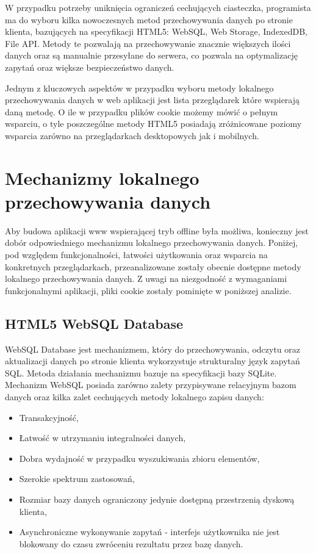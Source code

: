 W przypadku potrzeby uniknięcia ograniczeń cechujących ciasteczka, programista ma do wyboru kilka nowoczesnych metod przechowywania danych po stronie klienta, bazujących na specyfikacji HTML5: WebSQL, Web Storage, IndexedDB, File API. Metody te pozwalają na przechowywanie znacznie większych ilości danych oraz są manualnie przesyłane do serwera, co pozwala na optymalizację zapytań oraz większe bezpieczeństwo danych.

Jednym z kluczowych aspektów w przypadku wyboru metody lokalnego przechowywania danych w web aplikacji jest lista przeglądarek które wspierają daną metodę. O ile w przypadku plików cookie możemy mówić o pełnym wsparciu, o tyle poszczególne metody HTML5 posiadają zróżnicowane poziomy wsparcia zarówno na przeglądarkach desktopowych jak i mobilnych.

\section{Mechanizmy lokalnego przechowywania danych}
\label{sec:mechLokPrzechDanych}

Aby budowa aplikacji www wspierającej tryb offline była możliwa, konieczny jest dobór odpowiedniego mechanizmu lokalnego przechowywania danych. Poniżej, pod względem funkcjonalności, łatwości użytkowania oraz wsparcia na konkretnych przeglądarkach, przeanalizowane zostały obecnie dostępne metody lokalnego przechowywania danych. Z uwagi na niezgodność z wymaganiami funkcjonalnymi aplikacji,  pliki cookie zostały pominięte w poniższej analizie.

\subsection{HTML5 WebSQL Database}
\label{sec:html5WebSqlDatabase}

WebSQL Database jest mechanizmem, który do przechowywania, odczytu oraz aktualizacji danych po stronie klienta wykorzystuje strukturalny język zapytań SQL. Metoda działania mechanizmu bazuje na specyfikacji bazy SQLite. Mechanizm WebSQL posiada zarówno zalety przypisywane relacyjnym bazom danych oraz kilka zalet cechujących metody lokalnego zapisu danych:

\begin{itemize}
\item Transakcyjność,
\item Łatwość w utrzymaniu integralności danych,
\item Dobra wydajność w przypadku wyszukiwania zbioru elementów,
\item Szerokie spektrum zastosowań,
\item Rozmiar bazy danych ograniczony jedynie dostępną przestrzenią dyskową klienta,
\item Asynchroniczne wykonywanie zapytań - interfejs użytkownika nie jest blokowany do czasu zwróceniu rezultatu przez bazę danych.
\end{itemize}

